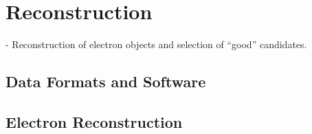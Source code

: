 \chapter{Reconstruction}
{\normalsize - Reconstruction of electron objects and selection of ``good'' candidates.}


\section{Data Formats and Software}

\section{Electron Reconstruction}